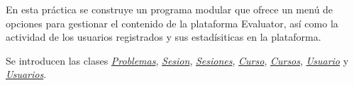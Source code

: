 En esta práctica se construye un programa modular que ofrece un menú de opciones para gestionar el contenido de la plataforma Evaluator, así como la actividad de los usuarios registrados y sus estadísiticas en la plataforma.

Se introducen las clases {\itshape \mbox{\hyperlink{class_problemas}{Problemas}}}, {\itshape \mbox{\hyperlink{class_sesion}{Sesion}}}, {\itshape \mbox{\hyperlink{class_sesiones}{Sesiones}}}, {\itshape \mbox{\hyperlink{class_curso}{Curso}}}, {\itshape \mbox{\hyperlink{class_cursos}{Cursos}}}, {\itshape \mbox{\hyperlink{class_usuario}{Usuario}}} y {\itshape \mbox{\hyperlink{class_usuarios}{Usuarios}}}. 